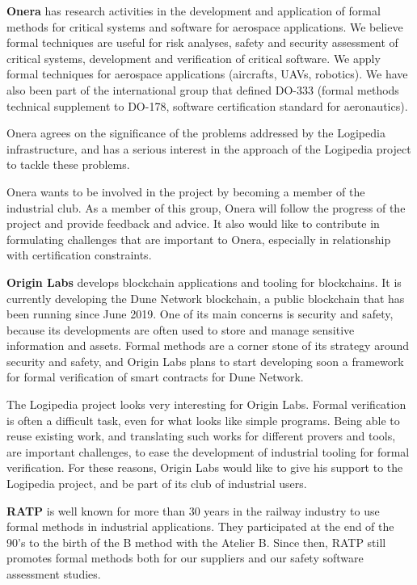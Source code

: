 {\bf Onera} has research activities in the development and application
of formal methods for critical systems and software for aerospace
applications. We believe formal techniques are useful for risk
analyses, safety and security assessment of critical systems,
development and verification of critical software. We apply formal
techniques for aerospace applications (aircrafts, UAVs, robotics). We
have also been part of the international group that defined DO-333
(formal methods technical supplement to DO-178, software certification
standard for aeronautics).

Onera agrees on the significance of the problems addressed by the
Logipedia infrastructure, and has a serious interest in the approach
of the Logipedia project to tackle these problems.

Onera wants to be involved in the project by becoming a member of the
industrial club. As a member of this group, Onera will follow the
progress of the project and provide feedback and advice. It also would
like to contribute in formulating challenges that are important to
Onera, especially in relationship with certification constraints.

{\bf Origin Labs} develops blockchain applications and tooling for
blockchains. It is currently developing the Dune Network blockchain, a
public blockchain that has been running since June 2019. One of its
main concerns is security and safety, because its developments are
often used to store and manage sensitive information and
assets. Formal methods are a corner stone of its strategy around
security and safety, and Origin Labs plans to start developing soon a
framework for formal verification of smart contracts for Dune Network.

The Logipedia project looks very interesting for Origin Labs. Formal
verification is often a difficult task, even for what looks like
simple programs. Being able to reuse existing work, and translating
such works for different provers and tools, are important challenges,
to ease the development of industrial tooling for formal
verification. For these reasons, Origin Labs would like to give his
support to the Logipedia project, and be part of its club of
industrial users.

{\bf RATP} is well known for more than 30 years in the railway
industry to use formal methods in industrial applications. They
participated at the end of the 90's to the birth of the B method with
the Atelier B. Since then, RATP still promotes formal methods both for
our suppliers and our safety software assessment studies.

